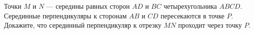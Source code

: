 \begin{ex}
	\begin{condition}
		Точки \( M \) и \( N \) --- середины равных сторон \( AD  \) и \( BC  \) четырехугольника \( ABCD \). Серединные перпендикуляры к сторонам \( AB  \) и \( CD  \) пересекаются в точке \( P \). Докажите, что серединный перпендикуляр к отрезку \( MN  \) проходит через точку \( P \).
	\end{condition}
\end{ex}